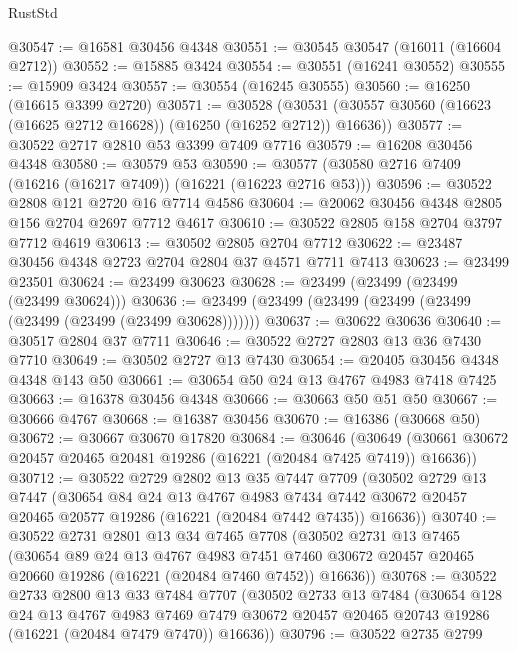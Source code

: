 \begin{lexlean}{RustStd}
\begin{coremodule}
@30547 := @16581 @30456 @4348
@30551 := @30545 @30547 (@16011 (@16604 @2712))
@30552 := @15885 @3424
@30554 := @30551 (@16241 @30552)
@30555 := @15909 @3424
@30557 := @30554 (@16245 @30555)
@30560 := @16250 (@16615 @3399 @2720)
@30571 := @30528
    (@30531 (@30557 @30560 (@16623 (@16625 @2712 @16628)) (@16250 (@16252 @2712)) @16636))
@30577 := @30522 @2717 @2810 @53 @3399 @7409 @7716
@30579 := @16208 @30456 @4348
@30580 := @30579 @53
@30590 := @30577 (@30580 @2716 @7409 (@16216 (@16217 @7409)) (@16221 (@16223 @2716 @53)))
@30596 := @30522 @2808 @121 @2720 @16 @7714 @4586
@30604 := @20062 @30456 @4348 @2805 @156 @2704 @2697 @7712 @4617
@30610 := @30522 @2805 @158 @2704 @3797 @7712 @4619
@30613 := @30502 @2805 @2704 @7712
@30622 := @23487 @30456 @4348 @2723 @2704 @2804 @37 @4571 @7711 @7413
@30623 := @23499 @23501
@30624 := @23499 @30623
@30628 := @23499 (@23499 (@23499 (@23499 @30624)))
@30636 := @23499 (@23499 (@23499 (@23499 (@23499 (@23499 (@23499 (@23499 @30628)))))))
@30637 := @30622 @30636
@30640 := @30517 @2804 @37 @7711
@30646 := @30522 @2727 @2803 @13 @36 @7430 @7710
@30649 := @30502 @2727 @13 @7430
@30654 := @20405 @30456 @4348 @4348 @143 @50
@30661 := @30654 @50 @24 @13 @4767 @4983 @7418 @7425
@30663 := @16378 @30456 @4348
@30666 := @30663 @50 @51 @50
@30667 := @30666 @4767
@30668 := @16387 @30456
@30670 := @16386 (@30668 @50)
@30672 := @30667 @30670 @17820
@30684 := @30646
    (@30649 (@30661 @30672 @20457 @20465 @20481 @19286 (@16221 (@20484 @7425 @7419)) @16636))
@30712 := @30522
    @2729
    @2802
    @13
    @35
    @7447
    @7709
    (@30502
      @2729
      @13
      @7447
      (@30654
        @84
        @24
        @13
        @4767
        @4983
        @7434
        @7442
        @30672
        @20457
        @20465
        @20577
        @19286
        (@16221 (@20484 @7442 @7435))
        @16636))
@30740 := @30522
    @2731
    @2801
    @13
    @34
    @7465
    @7708
    (@30502
      @2731
      @13
      @7465
      (@30654
        @89
        @24
        @13
        @4767
        @4983
        @7451
        @7460
        @30672
        @20457
        @20465
        @20660
        @19286
        (@16221 (@20484 @7460 @7452))
        @16636))
@30768 := @30522
    @2733
    @2800
    @13
    @33
    @7484
    @7707
    (@30502
      @2733
      @13
      @7484
      (@30654
        @128
        @24
        @13
        @4767
        @4983
        @7469
        @7479
        @30672
        @20457
        @20465
        @20743
        @19286
        (@16221 (@20484 @7479 @7470))
        @16636))
@30796 := @30522
    @2735
    @2799

\end{coremodule}
\end{lexlean}
